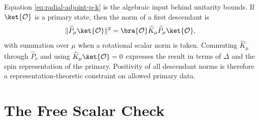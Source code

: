 Equation \eqref{eq:radial-adjoint-p-k} is the algebraic input behind
unitarity bounds.  If \(\ket{\mathcal O}\) is a primary state, then the norm
of a first descendant is
\[
  \|\widehat P_\mu\ket{\mathcal O}\|^2
  =
  \bra{\mathcal O}\widehat K_\mu\widehat P_\mu\ket{\mathcal O},
\]
with summation over \(\mu\) when a rotational scalar norm is taken.  Commuting
\(\widehat K_\mu\) through \(\widehat P_\nu\) and using
\(\widehat K_\mu\ket{\mathcal O}=0\) expresses the result in terms of
\(\Delta\) and the spin representation of the primary.  Positivity of all
descendant norms is therefore a representation-theoretic constraint on
allowed primary data.

\section{The Free Scalar Check}

